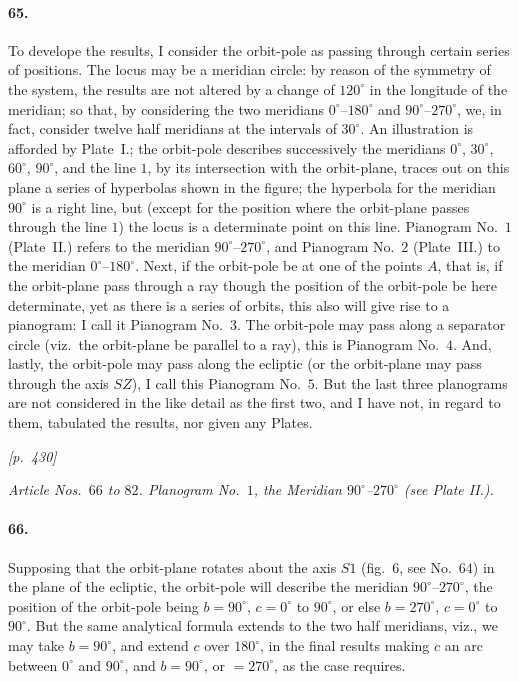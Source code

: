 \documentclass[11pt]{article}
\begin{document}
\paragraph{65.} To develope the results, I consider the orbit-pole as passing through certain series of positions. The locus may be a meridian circle: by reason of the symmetry of the system, the results are not altered by a change of $120^{\circ}$ in the longitude of the meridian; so that, by considering the two meridians $0^{\circ}$--$180^{\circ}$ and $90^{\circ}$--$270^{\circ}$, we, in fact, consider twelve half meridians at the intervals of $30^{\circ}$. An illustration is afforded by Plate~I.; the orbit-pole describes successively the meridians $0^{\circ}$, $30^{\circ}$, $60^{\circ}$, $90^{\circ}$, and the line $1$, by its intersection with the orbit-plane, traces out on this plane a series of hyperbolas shown in the figure; the hyperbola for the meridian $90^{\circ}$ is a right line, but (except for the position where the orbit-plane passes through the line $1$) the locus is a determinate point on this line. Pianogram No.~$1$ (Plate~II.) refers to the meridian $90^{\circ}$--$270^{\circ}$, and Pianogram No.~$2$ (Plate~III.) to the meridian $0^{\circ}$--$180^{\circ}$. Next, if the orbit-pole be at one of the points $A$, that is, if the orbit-plane pass through a ray though the position of the orbit-pole be here determinate, yet as there is a series of orbits, this also will give rise to a pianogram: I call it Pianogram No.~$3$. The orbit-pole may pass along a separator circle (viz.\ the orbit-plane be parallel to a ray), this is Pianogram No.~$4$. And, lastly, the orbit-pole may pass along the ecliptic (or the orbit-plane may pass through the axis $SZ$), I call this Pianogram No.~$5$. But the last three planograms are not considered in the like detail as the first two, and I have not, in regard to them, tabulated the results, nor given any Plates.

\medskip
\noindent\textit{[p.~430]}

\medskip

\begin{center}
\textit{Article Nos.~$66$ to $82$. Planogram No.~$1$, the Meridian $90^{\circ}$--$270^{\circ}$ (see Plate II.).}
\end{center}

\paragraph{66.} Supposing that the orbit-plane rotates about the axis $S1$ (fig.~$6$, see No.~$64$) in the plane of the ecliptic, the orbit-pole will describe the meridian $90^{\circ}$--$270^{\circ}$, the position of the orbit-pole being $b=90^{\circ}$, $c=0^{\circ}$ to $90^{\circ}$, or else $b=270^{\circ}$, $c=0^{\circ}$ to $90^{\circ}$. But the same analytical formula extends to the two half meridians, viz., we may take $b=90^{\circ}$, and extend $c$ over $180^{\circ}$, in the final results making $c$ an arc between $0^{\circ}$ and $90^{\circ}$, and $b=90^{\circ}$, or $=270^{\circ}$, as the case requires.
\end{document}
